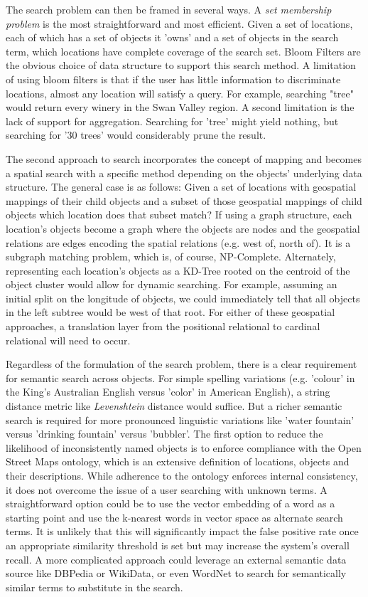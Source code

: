 The search problem can then be framed in several ways. 
A \textit{set membership problem} is the most straightforward and most efficient. Given a set of locations, each of which has a set of objects it 'owns' and a set of objects in the search term, which locations have complete coverage of the search set. Bloom Filters are the obvious choice of data structure to support this search method. 
A limitation of using bloom filters is that if the user has little information to discriminate locations, almost any location will satisfy a query. 
For example, searching "tree" would return every winery in the Swan Valley region. A second limitation is the lack of support for aggregation. Searching for 'tree' might yield nothing, but searching for '30 trees' would considerably prune the result.

The second approach to search incorporates the concept of mapping and becomes a spatial search with a specific method depending on the objects' underlying data structure. 
The general case is as follows: Given a set of locations with geospatial mappings of their child objects and a subset of those geospatial mappings of child objects which location does that subset match? 
If using a graph structure, each location's objects become a graph where the objects are nodes and the geospatial relations are edges encoding the spatial relations (e.g. west of, north of). It is a subgraph matching problem, which is, of course, NP-Complete. 
Alternately, representing each location's objects as a KD-Tree rooted on the centroid of the object cluster would allow for dynamic searching. For example, assuming an initial split on the longitude of objects, we could immediately tell that all objects in the left subtree would be west of that root. 
For either of these geospatial approaches, a translation layer from the positional relational to cardinal relational will need to occur.

Regardless of the formulation of the search problem, there is a clear requirement for semantic search across objects. For simple spelling variations (e.g. 'colour' in the King's Australian English versus 'color' in American English), a string distance metric like \textit{Levenshtein} distance would suffice. 
But a richer semantic search is required for more pronounced linguistic variations like 'water fountain' versus 'drinking fountain' versus 'bubbler'. 
The first option to reduce the likelihood of inconsistently named objects is to enforce compliance with the Open Street Maps ontology, which is an extensive definition of locations, objects and their descriptions. 
While adherence to the ontology enforces internal consistency, it does not overcome the issue of a user searching with unknown terms. 
A straightforward option could be to use the vector embedding of a word as a starting point and use the k-nearest words in vector space as alternate search terms. 
It is unlikely that this will significantly impact the false positive rate once an appropriate similarity threshold is set but may increase the system's overall recall. 
A more complicated approach could leverage an external semantic data source like DBPedia or WikiData, or even WordNet to search for semantically similar terms to substitute in the search. 

